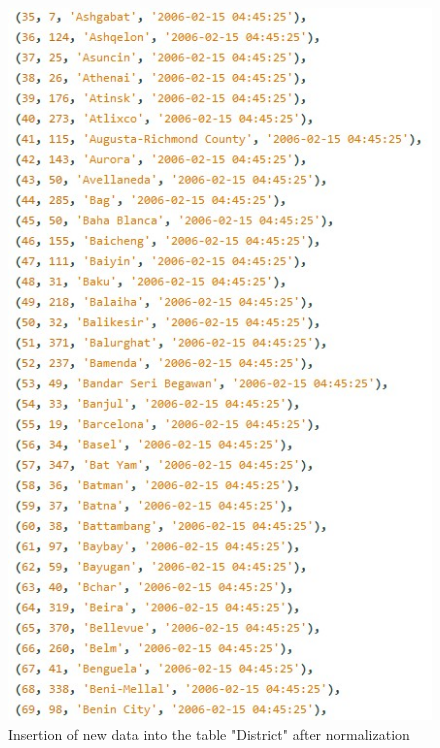 \documentclass{article}
\begin{document}
\begin{figure}[H]
			\includegraphics[width=\textwidth]{district2_insert_norm}
			\caption{Insertion of new data into the table "District" after normalization}
		\end{figure}
\end{document}
